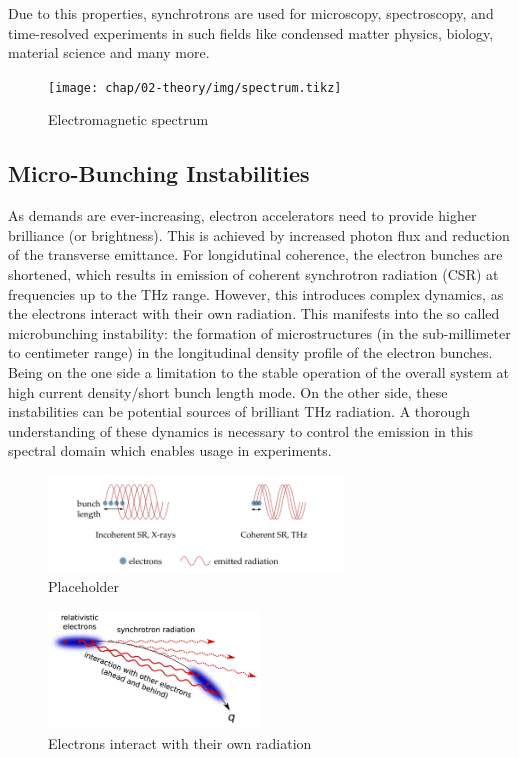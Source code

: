 Due to this properties, synchrotrons are used for microscopy, spectroscopy, and time-resolved experiments in such fields like condensed matter physics, biology, material science and many more. 
\begin{figure}[H]
	\centering
	\texttt{[image: chap/02-theory/img/spectrum.tikz]}
	\caption{Electromagnetic spectrum}
	\label{fig:spectrum}
\end{figure}

\subsection{Micro-Bunching Instabilities}
As demands are ever-increasing, electron accelerators need to provide higher brilliance (or brightness). This is achieved by increased photon flux and reduction of the transverse emittance. For longidutinal coherence, the electron bunches are shortened, which results in emission of coherent synchrotron radiation (CSR) at frequencies up to the THz range. However, this introduces complex dynamics, as the electrons interact with their own radiation. This manifests into the so called microbunching instability: the formation of microstructures (in the sub-millimeter to centimeter range) in the longitudinal density profile of the electron bunches. Being on the one side a limitation to the stable operation of the overall system at high current density/short bunch length mode. On the other side, these instabilities can be potential sources of brilliant THz radiation. A thorough understanding of these dynamics is necessary to control the emission in this spectral domain which enables usage in experiments. \cite{rota2018} \cite{brosi}

\begin{figure}[H]
	\centering
	\includegraphics[width = 0.7\textwidth]{chap/02-theory/img/csr2.png}
	\caption{Placeholder \cite{rota2018}}
	\label{fig:csr}
\end{figure}

\begin{figure}[H]
	\centering
	\includegraphics[width = 0.5\textwidth]{chap/02-theory/img/microbunching}
	\caption{Electrons interact with their own radiation \cite{Bielawski2019}}
	\label{fig:microBunch}
\end{figure}









